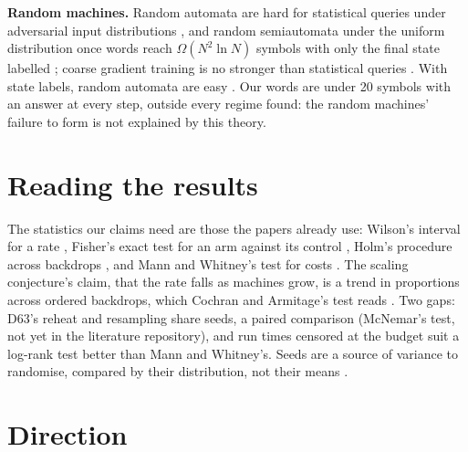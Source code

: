 \documentclass[11pt]{article}
\begin{document}
\textbf{Random machines.} Random automata are hard for statistical queries under adversarial input
distributions \citep{angluin-2010-lower-bounds-random-structures-sq}, and random semiautomata under
the uniform distribution once words reach $\Omega(N^2 \ln N)$ symbols with only the final state
labelled \citep{giapitzakis-2025-sq-complexity-learning-semiautomata}; coarse gradient training is no
stronger than statistical queries \citep{abbe-2021-power-differentiable-learning-pac-sq}. With state
labels, random automata are easy \citep{angluin-2015-learning-random-dfa-uniform-strings-state}. Our
words are under 20 symbols with an answer at every step, outside every regime found: the random
machines' failure to form is not explained by this theory.

\section{Reading the results}

The statistics our claims need are those the papers already use: Wilson's interval for a rate
\citep{wilson-1927-probable-inference}, Fisher's exact test for an arm against its control
\citep{fisher-1922-contingency}, Holm's procedure across backdrops
\citep{holm-1979-sequentially-rejective}, and Mann and Whitney's test for costs
\citep{mann-whitney-1947}. The scaling conjecture's claim, that the rate falls as machines grow, is a
trend in proportions across ordered backdrops, which Cochran and Armitage's test reads
\citep{cochran-1954-chi-square,armitage-1955-trend}. Two gaps: D63's reheat and resampling share
seeds, a paired comparison (McNemar's test, not yet in the literature repository), and run times
censored at the budget suit a log-rank test better than Mann and Whitney's. Seeds are a source of
variance to randomise, compared by their distribution, not their means
\citep{bouthillier-2021-accounting-variance-ml-benchmarks}.

\section{Direction}
\end{document}
